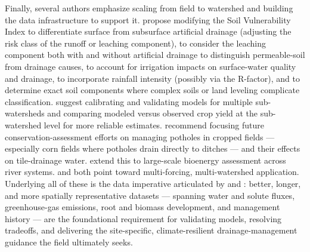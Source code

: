 Finally, several authors emphasize scaling from field to watershed and building the data infrastructure to support it. \textcite{Baffaut2020} propose modifying the Soil Vulnerability Index to differentiate surface from subsurface artificial drainage (adjusting the risk class of the runoff or leaching component), to consider the leaching component both with and without artificial drainage to distinguish permeable-soil from drainage causes, to account for irrigation impacts on surface-water quality and drainage, to incorporate rainfall intensity (possibly via the R-factor), and to determine exact soil components where complex soils or land leveling complicate classification. \textcite{Singh2023} suggest calibrating and validating models for multiple sub-watersheds and comparing modeled versus observed crop yield at the sub-watershed level for more reliable estimates. \textcite{Smith2008} recommend focusing future conservation-assessment efforts on managing potholes in cropped fields --- especially corn fields where potholes drain directly to ditches --- and their effects on tile-drainage water. \textcite{Guo2018} extend this to large-scale bioenergy assessment across river systems. \textcite{Ferin2023} and \textcite{Deng2011} both point toward multi-forcing, multi-watershed application. Underlying all of these is the data imperative articulated by \textcite{Ma2025} and \textcite{SKAGGS1994}: better, longer, and more spatially representative datasets --- spanning water and solute fluxes, greenhouse-gas emissions, root and biomass development, and management history --- are the foundational requirement for validating models, resolving tradeoffs, and delivering the site-specific, climate-resilient drainage-management guidance the field ultimately seeks.